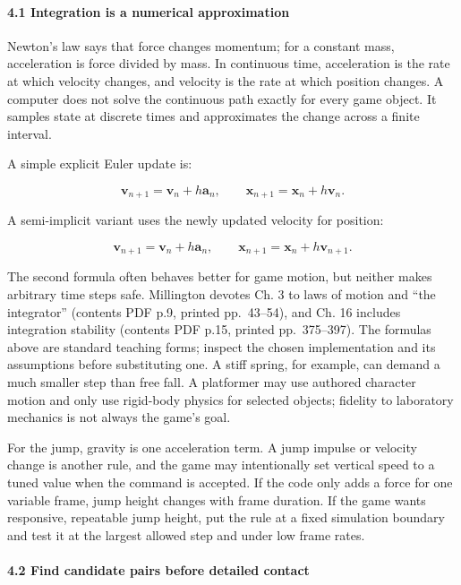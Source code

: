 \paragraph{4.1 Integration is a numerical approximation}\label{integration-is-a-numerical-approximation}

Newton's law says that force changes momentum; for a constant mass, acceleration is force divided by mass. In continuous time, acceleration is the rate at which velocity changes, and velocity is the rate at which position changes. A computer does not solve the continuous path exactly for every game object. It samples state at discrete times and approximates the change across a finite interval.

A simple explicit Euler update is:

\[
\mathbf{v}_{n+1}=\mathbf{v}_n+h\mathbf{a}_n,
\qquad
\mathbf{x}_{n+1}=\mathbf{x}_n+h\mathbf{v}_n.
\]

A semi-implicit variant uses the newly updated velocity for position:

\[
\mathbf{v}_{n+1}=\mathbf{v}_n+h\mathbf{a}_n,
\qquad
\mathbf{x}_{n+1}=\mathbf{x}_n+h\mathbf{v}_{n+1}.
\]

The second formula often behaves better for game motion, but neither makes arbitrary time steps safe. Millington devotes Ch. 3 to laws of motion and ``the integrator'' (contents PDF p.9, printed pp.~43--54), and Ch. 16 includes integration stability (contents PDF p.15, printed pp.~375--397). The formulas above are standard teaching forms; inspect the chosen implementation and its assumptions before substituting one. A stiff spring, for example, can demand a much smaller step than free fall. A platformer may use authored character motion and only use rigid-body physics for selected objects; fidelity to laboratory mechanics is not always the game's goal.

For the jump, gravity is one acceleration term. A jump impulse or velocity change is another rule, and the game may intentionally set vertical speed to a tuned value when the command is accepted. If the code only adds a force for one variable frame, jump height changes with frame duration. If the game wants responsive, repeatable jump height, put the rule at a fixed simulation boundary and test it at the largest allowed step and under low frame rates.

\paragraph{4.2 Find candidate pairs before detailed contact}\label{find-candidate-pairs-before-detailed-contact}

